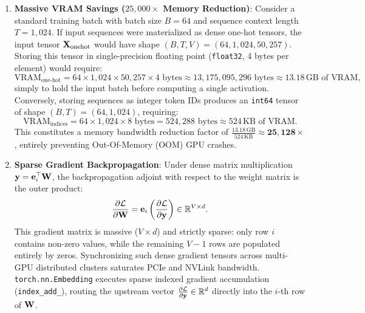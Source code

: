 \documentclass[../../../main.tex]{subfiles}
\begin{document}
\begin{enumerate}
    \item \textbf{Massive VRAM Savings ($25{,}000\times$ Memory Reduction)}:
    Consider a standard training batch with batch size $B = 64$ and sequence context length $T = 1{,}024$. If input sequences were materialized as dense one-hot tensors, the input tensor $\mathbf{X}_{\text{onehot}}$ would have shape $(B, T, V) = (64, 1{,}024, 50{,}257)$. Storing this tensor in single-precision floating point (\texttt{float32}, 4 bytes per element) would require:
    \begin{equation}
    \label{eq:vram_blowout}
    \text{VRAM}_{\text{one-hot}} = 64 \times 1{,}024 \times 50{,}257 \times 4 \text{ bytes} \approx 13{,}175{,}095{,}296 \text{ bytes} \approx 13.18\,\text{GB of VRAM},
    \end{equation}
    simply to hold the input batch before computing a single activation.
    Conversely, storing sequences as integer token IDs produces an \texttt{int64} tensor of shape $(B, T) = (64, 1{,}024)$, requiring:
    \begin{equation}
    \label{eq:vram_compact}
    \text{VRAM}_{\text{indices}} = 64 \times 1{,}024 \times 8 \text{ bytes} = 524{,}288 \text{ bytes} \approx 524\,\text{KB of VRAM}.
    \end{equation}
    This constitutes a memory bandwidth reduction factor of $\frac{13.18\,\text{GB}}{524\,\text{KB}} \approx \mathbf{25{,}128\times}$, entirely preventing Out-Of-Memory (OOM) GPU crashes.

    \item \textbf{Sparse Gradient Backpropagation}:
    Under dense matrix multiplication $\mathbf{y} = \mathbf{e}_i^\top \mathbf{W}$, the backpropagation adjoint with respect to the weight matrix is the outer product:
    \begin{equation}
    \label{eq:gradient_outer_product}
    \frac{\partial \mathcal{L}}{\partial \mathbf{W}} = \mathbf{e}_i \left( \frac{\partial \mathcal{L}}{\partial \mathbf{y}} \right) \in \mathbb{R}^{V \times d}.
    \end{equation}
    This gradient matrix is massive ($V \times d$) and strictly sparse: only row $i$ contains non-zero values, while the remaining $V-1$ rows are populated entirely by zeros. Synchronizing such dense gradient tensors across multi-GPU distributed clusters saturates PCIe and NVLink bandwidth. \texttt{torch.nn.Embedding} executes sparse indexed gradient accumulation (\texttt{index\_add\_}), routing the upstream vector $\frac{\partial \mathcal{L}}{\partial \mathbf{y}} \in \mathbb{R}^d$ directly into the $i$-th row of $\mathbf{W}$.
\end{enumerate}
\end{document}
